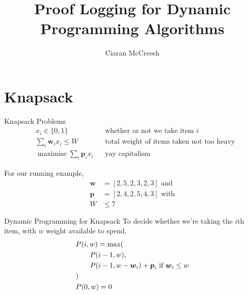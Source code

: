 \documentclass[aspectratio=169,compress,10pt]{beamer}
\author{Ciaran McCreesh}
\title{Proof Logging for Dynamic Programming Algorithms}
\begin{document}
{
    \begin{frame}
        \titlepage
    \end{frame}
}

\section{Knapsack}

\begin{frame}{Knapsack Problems}
    \begin{align*}
        &x_i \in \{0, 1\} && \text{whether or not we take item $i$}\\
        &\sum_i \boldsymbol{w}_i x_i \le W && \text{total weight of items taken not too heavy}\\
        &\operatorname{maximise} \sum_i \boldsymbol{p}_i x_i && \text{yay capitalism}
    \end{align*}

    For our running example,
    \begin{align*}
        \boldsymbol{w} &= [2, 5, 2, 3, 2, 3] \text{~and}\\
        \boldsymbol{p} &= [2, 4, 2, 5, 4, 3] \text{~with}\\
        W &\le 7
    \end{align*}

\end{frame}

\begin{frame}{Dynamic Programming for Knapsack}
    To decide whether we're taking the $i$th item, with $w$ weight available to spend,
    \begin{align*}
        & P(i, w) = \operatorname{max}(\\
        &     \qquad P(i - 1, w),\\
        &     \qquad P(i - 1, w - \boldsymbol{w}_i) + \boldsymbol{p}_i \text{~if~} \boldsymbol{w}_i \le w \\
        & ) \\ \medskip
        & P(0, w) = 0
    \end{align*}
\end{frame}
\end{document}
